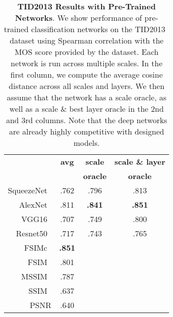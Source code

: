 \begin{table}[t]
\begin{center}
\scalebox{0.85} {
\begin{tabular}{ r c c c } \\
& \textbf{avg} & \textbf{scale} & \textbf{scale \& layer} \\
& & \textbf{oracle} & \textbf{oracle} \\ \hline
SqueezeNet~\cite{iandola2016squeezenet} & .762 & .796 & .813 \\
AlexNet~\cite{krizhevsky2014one} & .811 & \textbf{.841} & \textbf{.851} \\
VGG16~\cite{simonyan2014very} & .707 & .749 & .800 \\
Resnet50~\cite{he2015deep} & .717 & .743 & .765 \\
\hline
FSIMc~\cite{zhang2011fsim} & \textbf{.851} &  &  \\
FSIM~\cite{zhang2011fsim} & .801 &  &  \\
MSSIM~\cite{wang2003multiscale} & .787 & & \\
SSIM~\cite{wang2004image} & .637 &  &  \\
PSNR & .640 &  &  \\
\end{tabular}
}
\label{tab:tid}
\caption{\textbf{TID2013 Results with Pre-Trained Networks}. We show performance of pre-trained classification networks on the TID2013~\cite{ponomarenko2015image} dataset using Spearman correlation with the MOS score provided by the dataset. Each network is run across multiple scales. In the first column, we compute the average cosine distance across all scales and layers. We then assume that the network has a scale oracle, as well as a scale \& best layer oracle in the 2nd and 3rd columns. Note that the deep networks are already highly competitive with designed models.}
\end{center}
\end{table}
